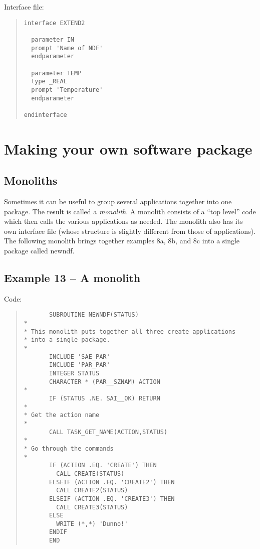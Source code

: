 Interface file:

\begin{quote}
{\small
\begin{verbatim}
interface EXTEND2

  parameter IN
  prompt 'Name of NDF'
  endparameter

  parameter TEMP
  type _REAL
  prompt 'Temperature'
  endparameter

endinterface
\end{verbatim}
}
\end{quote}

\section{Making your own software package}

\subsection{Monoliths}

Sometimes it can be useful to group several applications together into
one package. The result is called a {\em monolith}. A monolith consists
of a ``top level'' code which then calls the various applications as needed.
The monolith also has its own interface file (whose structure is slightly
different from those of applications). The following monolith brings
together examples 8a, 8b, and 8c into a single package called {\sf newndf}.

\subsection{Example 13 -- A monolith}

Code:

\begin{quote}
{\small
\begin{verbatim}
       SUBROUTINE NEWNDF(STATUS)
*
* This monolith puts together all three create applications
* into a single package.
*
       INCLUDE 'SAE_PAR'
       INCLUDE 'PAR_PAR'
       INTEGER STATUS
       CHARACTER * (PAR__SZNAM) ACTION
*
       IF (STATUS .NE. SAI__OK) RETURN
*
* Get the action name
*
       CALL TASK_GET_NAME(ACTION,STATUS)
*
* Go through the commands
*
       IF (ACTION .EQ. 'CREATE') THEN
         CALL CREATE(STATUS)
       ELSEIF (ACTION .EQ. 'CREATE2') THEN
         CALL CREATE2(STATUS)
       ELSEIF (ACTION .EQ. 'CREATE3') THEN
         CALL CREATE3(STATUS)
       ELSE
         WRITE (*,*) 'Dunno!'
       ENDIF
       END
\end{verbatim}
}
\end{quote}

